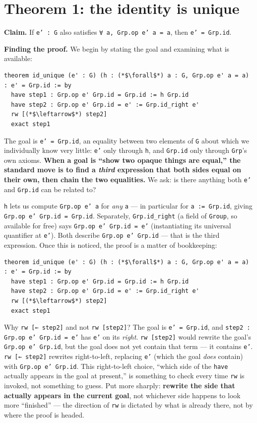 \section{Theorem 1: the identity is unique}\label{sec:07-group-theorems:02-theorem-1:1}

\textbf{Claim.} If \texttt{e' : G} also satisfies \texttt{∀ a, Grp.op e' a = a}, then \texttt{e' = Grp.id}.

\textbf{Finding the proof.} We begin by stating the goal and examining what is available:

\begin{lstlisting}
theorem id_unique (e' : G) (h : (*$\forall$*) a : G, Grp.op e' a = a) : e' = Grp.id := by
  have step1 : Grp.op e' Grp.id = Grp.id := h Grp.id
  have step2 : Grp.op e' Grp.id = e' := Grp.id_right e'
  rw [(*$\leftarrow$*) step2]
  exact step1
\end{lstlisting}

The goal is \texttt{e' = Grp.id}, an equality between two elements of \texttt{G} about which we individually know very little: \texttt{e'} only through \texttt{h}, and \texttt{Grp.id} only through \texttt{Grp}'s own axioms. \textbf{When a goal is ``show two opaque things are equal,'' the standard move is to find a \emph{third} expression that both sides equal on their own, then chain the two equalities.} We ask: is there anything both \texttt{e'} and \texttt{Grp.id} can be related to?

\texttt{h} lets us compute \texttt{Grp.op e' a} for \emph{any} \texttt{a} --- in particular for \texttt{a := Grp.id}, giving \texttt{Grp.op e' Grp.id = Grp.id}. Separately, \texttt{Grp.id\_\allowbreak{}right} (a field of \texttt{Group}, so available for free) says \texttt{Grp.op e' Grp.id = e'} (instantiating its universal quantifier at \texttt{e'}). Both describe \texttt{Grp.op e' Grp.id} --- that is the third expression. Once this is noticed, the proof is a matter of bookkeeping:

\begin{lstlisting}
theorem id_unique (e' : G) (h : (*$\forall$*) a : G, Grp.op e' a = a) : e' = Grp.id := by
  have step1 : Grp.op e' Grp.id = Grp.id := h Grp.id
  have step2 : Grp.op e' Grp.id = e' := Grp.id_right e'
  rw [(*$\leftarrow$*) step2]
  exact step1
\end{lstlisting}

Why \texttt{rw [← step2]} and not \texttt{rw [step2]}? The goal is \texttt{e' = Grp.id}, and \texttt{step2 : Grp.op e' Grp.id = e'} has \texttt{e'} on its \emph{right}. \texttt{rw [step2]} would rewrite the goal's \texttt{Grp.op e' Grp.id}, but the goal does not yet contain that term --- it contains \texttt{e'}. \texttt{rw [← step2]} rewrites right-to-left, replacing \texttt{e'} (which the goal \emph{does} contain) with \texttt{Grp.op e' Grp.id}. This right-to-left choice, ``which side of the \texttt{have} actually appears in the goal at present,'' is something to check every time \texttt{rw} is invoked, not something to guess. Put more sharply: \textbf{rewrite the side that actually appears in the current goal}, not whichever side happens to look more ``finished'' --- the direction of \texttt{rw} is dictated by what is already there, not by where the proof is headed.

